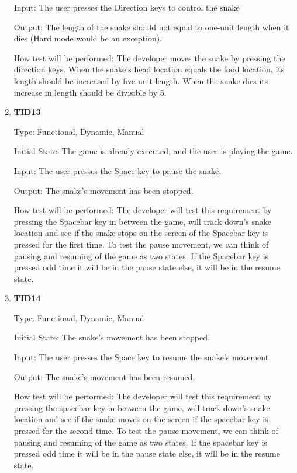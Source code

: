 \documentclass[12pt, titlepage]{article}
\begin{document}
\begin{enumerate}
Input: The user presses the Direction keys to control the snake

Output: The length of the snake should not equal to one-unit length when it dies (Hard mode would be an exception).
					
How test will be performed: The developer moves the snake by pressing the direction keys. When the snake's head location equals the food location, its length should be increased by five unit-length. When the snake dies its increase in length should be divisible by 5.

\item{\textbf{TID13}\\}

Type: Functional, Dynamic, Manual 	
					
Initial State: The game is already executed, and the user is playing the game.
				
Input: The user presses the Space key to pause the snake.

Output: The snake's movement has been stopped.   
        		
How test will be performed: The developer will test this requirement by pressing the Spacebar key in between the game,  will track down's snake location and see if the snake stops on the screen of the Spacebar key is pressed for the first time.
To test the pause movement, we can think of pausing and resuming of the game as two states. If the Spacebar key is pressed odd time it will be in the pause state else, it will be in the resume state. 

\item{\textbf{TID14}\\}

Type: Functional, Dynamic, Manual 	
					
Initial State: The snake's movement has been stopped.
				
Input: The user presses the Space key to resume the snake's movement.

Output: The snake's movement has been resumed.   
        		
How test will be performed: The developer will test this requirement by pressing the spacebar key in between the game,  will track down's snake location and see if the snake moves on the screen if the spacebar key is pressed for the second time.
To test the pause movement, we can think of pausing and resuming of the game as two states. If the spacebar key is pressed odd time it will be in the pause state else, it will be in the resume state. 


\end{enumerate}
\end{document}

